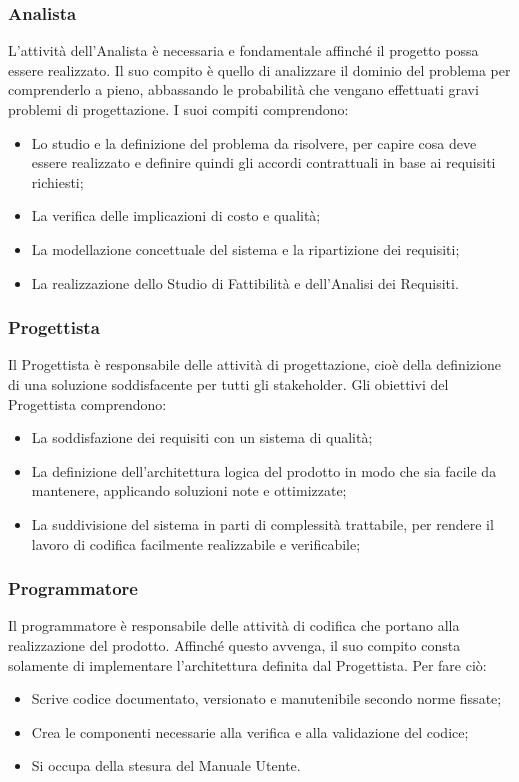 \documentclass[NormeDiProgetto.tex]{subfiles}
\begin{document}
	\subsubsection{Analista}
	L'attività dell'Analista è necessaria e fondamentale affinché il progetto possa essere realizzato. Il suo compito è quello di analizzare il dominio del problema per comprenderlo a pieno, abbassando le probabilità che vengano effettuati gravi problemi di progettazione. I suoi compiti comprendono:
	\begin{itemize}
		\item Lo studio e la definizione del problema da risolvere, per capire cosa deve essere realizzato e definire quindi gli accordi contrattuali in base ai requisiti richiesti;
		\item La verifica delle implicazioni di costo e qualità;
		\item La modellazione concettuale del sistema e la ripartizione dei requisiti;
		\item La realizzazione dello Studio di Fattibilità e dell'Analisi dei Requisiti.
	\end{itemize}
	\subsubsection{Progettista}
	Il Progettista è responsabile delle attività di progettazione, cioè della definizione di una soluzione soddisfacente per tutti gli stakeholder. Gli obiettivi del Progettista comprendono:
	\begin{itemize}
		\item La soddisfazione dei requisiti con un sistema di qualità;
		\item La definizione dell'architettura logica del prodotto in modo che sia facile da mantenere, applicando soluzioni note e ottimizzate;
		\item La suddivisione del sistema in parti di complessità trattabile, per rendere il lavoro di codifica facilmente realizzabile e verificabile;
	\end{itemize} 

	\subsubsection{Programmatore}
	Il programmatore è responsabile delle attività di codifica che portano alla realizzazione del prodotto. Affinché questo avvenga, il suo compito consta solamente di implementare l'architettura definita dal Progettista. Per fare ciò:
	\begin{itemize}
		\item Scrive codice documentato, versionato e manutenibile secondo norme fissate;
		\item Crea le componenti necessarie alla verifica e alla validazione del codice;
		\item Si occupa della stesura del Manuale Utente.
	\end{itemize}
\end{document}
